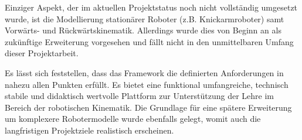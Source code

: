 Einziger Aspekt, der im aktuellen Projekt\-status noch nicht voll\-stän\-dig um\-ge\-setzt wurde,
ist die Modellierung stationärer Roboter (z.B. Knickarmroboter) samt Vorwärts- und Rückwärtskinematik.
Allerdings wurde dies von Beginn an als zukünftige Erweiterung vorgesehen und fällt nicht in den unmittelbaren Umfang dieser Projektarbeit.

Es lässt sich feststellen, dass das Framework die definierten Anforderungen in nahezu allen Punkten erfüllt.
Es bietet eine funktional umfangreiche, technisch stabile und didaktisch wertvolle Plattform zur Unterstützung der Lehre im Bereich der robotischen Kinematik.
Die Grundlage für eine spätere Erweiterung um komplexere Robotermodelle wurde ebenfalls gelegt, womit auch die langfristigen Projektziele realistisch erscheinen.
